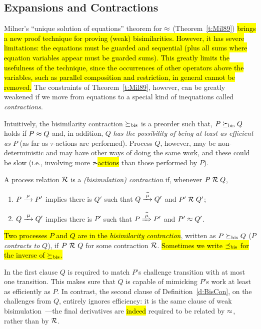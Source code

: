 \subsection{Expansions and Contractions}
\label{s:mcontr}

Milner's ``unique solution of equations'' theorem for $\approx$
(Theorem~\ref{t:Mil89})
\hl{brings a new proof technique for proving (weak) bisimilarities. However, it has
severe limitations: the equations must be guarded and sequential (plus
all sums where equation variables appear must be guarded sums).
This greatly limits the usefulness of the technique, since
the occurrences of other operators above the variables, such as parallel
composition and restriction, in general cannot be removed.}
The constraints of Theorem~\ref{t:Mil89}, however, can be greatly
weakened if we move from equations to a special kind of inequations called
  \emph{contractions}.

Intuitively, the bisimilarity contraction $\mathrel{\succeq_{\rm{bis}}}$ is a preorder
such that, $P \mathrel{\succeq_{\rm{bis}}} Q$ holds if $P \approx Q$ and, in addition, 
$Q$ \emph{has the possibility of being at least as efficient as $P$} (as far as
$\tau$-actions are performed).
Process $Q$, however, may be non-deterministic and may have other ways
of doing the same work, and these could be slow (i.e., involving
more $\tau$-\hl{actions} than those performed by $P$).

\begin{definition}[contraction]
\label{d:BisCon}
A process relation ${{\cal R}}$ 
 is a \emph{(bisimulation) contraction} if, whenever
 $P\mathrel{\cal R} Q$, %

\begin{enumerate}
\item   $P \arr\mu P'$ implies there is $Q'$ such that $Q \arcap \mu
  Q'$ and $P' \mathrel{\cal R} Q'$;
\item $Q \arr\mu Q'$   implies there is $P'$ such that $P \Arcap \mu
 P'$ and $P' \approx Q'$\enspace.
\end{enumerate}
\hl{Two processes $P$ and $Q$ are in the \emph{bisimilarity
    contraction}}, written as $P \mathrel{\succeq_{\rm{bis}}} Q$ ($P$ \emph{contracts to} $Q$),
if $P\ {\cal R}\ Q$ for some contraction ${\cal R}$.
\hl{Sometimes we write $\mathrel{\preceq_{\rm{bis}}}$ for the inverse of $\mathrel{\succeq_{\rm{bis}}}$.}
\end{definition}

In the first clause $Q$ is required to match $P$'s challenge
transition with at most one transition.
This makes sure that $Q$ is capable of mimicking %
$P$'s work at least as efficiently as $P$. 
In contrast, the second clause of Definition~\ref{d:BisCon}, on the
challenges from $Q$, entirely ignores efficiency: it is the same
clause of  weak bisimulation~---the final derivatives are \hl{indeed} required
to be related  by $\approx$, rather than by ${\cal R}$.

